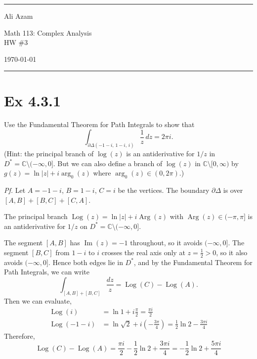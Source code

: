 \documentclass[a4paper]{article}
\begin{document}
\hrule\medskip
\begin{minipage}{0.295\textwidth}\raggedright\footnotesize
Ali Azam
\end{minipage}%
\begin{minipage}{0.4\textwidth}\centering
\large Math 113: Complex Analysis\\
\normalsize HW \#3
\end{minipage}%
\begin{minipage}{0.295\textwidth}\raggedleft
\today
\end{minipage}
\medskip\hrule\bigskip

\section*{Ex 4.3.1}

\begin{tcolorbox}[colback=gray!10, colframe=black, boxrule=0.5pt, arc=2mm]
Use the Fundamental Theorem for Path Integrals to show that
\[
  \int_{\partial\Delta(-1-i,\,1-i,\,i)} \frac{1}{z}\,dz = 2\pi i.
\]
(Hint: the principal branch of $\log(z)$ is an antiderivative for $1/z$ in $D^{*}=\mathbb{C}\setminus(-\infty,0]$.
But we can also define a branch of $\log(z)$ in $\mathbb{C}\setminus[0,\infty)$ by
$g(z)=\ln|z|+i\arg_0(z)$ where $\arg_0(z)\in(0,2\pi)$.)
\end{tcolorbox}

\textit{Pf.} Let $A=-1-i$, $B=1-i$, $C=i$ be the vertices. The boundary $\partial\Delta$ is over $[A,B]+[B,C]+[C,A]$.

\medskip
The principal branch $\operatorname{Log}(z)=\ln|z|+i\operatorname{Arg}(z)$ with $\operatorname{Arg}(z)\in(-\pi,\pi]$ is an antiderivative for $1/z$ on $D^{*}=\mathbb{C}\setminus(-\infty,0]$.

The segment $[A,B]$ has $\operatorname{Im}(z)=-1$ throughout, so it avoids $(-\infty,0]$.
The segment $[B,C]$ from $1-i$ to $i$ crosses the real axis only at $z=\tfrac{1}{2}>0$, so it also avoids $(-\infty,0]$.
Hence both edges lie in $D^{*}$, and by the Fundamental Theorem for Path Integrals, we can write
\[
  \int_{[A,B]+[B,C]} \frac{dz}{z}
  = \operatorname{Log}(C)-\operatorname{Log}(A).
\]
Then we can evaluate,
\begin{align*}
  \operatorname{Log}(i) & =\ln 1+i\frac{\pi}{2}=\frac{\pi i}{2}\\
  \operatorname{Log}(-1-i) &=\ln\sqrt{2}+i\!\left(-\frac{3\pi}{4}\right) =\tfrac{1}{2}\ln 2-\tfrac{3\pi i}{4}
\end{align*}
Therefore,
\[
  \operatorname{Log}(C)-\operatorname{Log}(A)
  = \frac{\pi i}{2}-\frac{1}{2}\ln 2+\frac{3\pi i}{4}
  = -\frac{1}{2}\ln 2+\frac{5\pi i}{4}
\]
\end{document}
